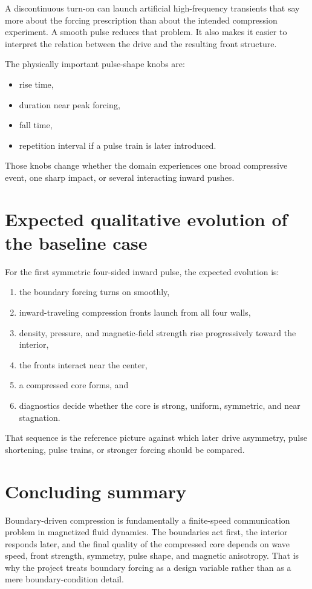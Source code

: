 \documentclass[11pt]{article}
\begin{document}
A discontinuous turn-on can launch artificial high-frequency transients that say more about the forcing prescription than about the intended compression experiment. A smooth pulse reduces that problem. It also makes it easier to interpret the relation between the drive and the resulting front structure.

The physically important pulse-shape knobs are:
\begin{itemize}
    \item rise time,
    \item duration near peak forcing,
    \item fall time,
    \item repetition interval if a pulse train is later introduced.
\end{itemize}

Those knobs change whether the domain experiences one broad compressive event, one sharp impact, or several interacting inward pushes.

\section{Expected qualitative evolution of the baseline case}
For the first symmetric four-sided inward pulse, the expected evolution is:
\begin{enumerate}
    \item the boundary forcing turns on smoothly,
    \item inward-traveling compression fronts launch from all four walls,
    \item density, pressure, and magnetic-field strength rise progressively toward the interior,
    \item the fronts interact near the center,
    \item a compressed core forms, and
    \item diagnostics decide whether the core is strong, uniform, symmetric, and near stagnation.
\end{enumerate}

That sequence is the reference picture against which later drive asymmetry, pulse shortening, pulse trains, or stronger forcing should be compared.

\section{Concluding summary}
Boundary-driven compression is fundamentally a finite-speed communication problem in magnetized fluid dynamics. The boundaries act first, the interior responds later, and the final quality of the compressed core depends on wave speed, front strength, symmetry, pulse shape, and magnetic anisotropy. That is why the project treats boundary forcing as a design variable rather than as a mere boundary-condition detail.
\end{document}
